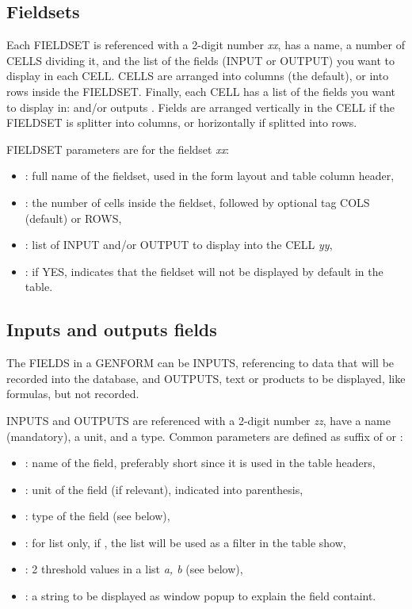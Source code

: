 \subsection{Fieldsets}

Each FIELDSET is referenced with a 2-digit number {\it xx}, has a name, a number of CELLS dividing it, and the list of the fields (INPUT or OUTPUT) you want to display in each CELL. CELLS are arranged into columns (the default), or into rows inside the FIELDSET. Finally, each CELL has a list of the fields you want to display in:  and/or outputs . Fields are arranged vertically in the CELL if the FIELDSET is splitter into columns, or horizontally if splitted into rows.

FIELDSET parameters are for the fieldset {\it xx}:
\begin{itemize}
	\item {}: full name of the fieldset, used in the form layout and table column header,
	\item {}: the number of cells inside the fieldset, followed by optional tag COLS (default) or ROWS,
	\item {}: list of INPUT and/or OUTPUT to display into the CELL {\it yy},
	\item {}: if YES, indicates that the fieldset will not be displayed by default in the table.
\end{itemize}

\subsection{Inputs and outputs fields}
The FIELDS in a GENFORM can be INPUTS, referencing to data that will be recorded into the database, and OUTPUTS, text or products to be displayed, like formulas, but not recorded.

INPUTS and OUTPUTS are referenced with a 2-digit number {\it zz}, have a name (mandatory), a unit, and a type. Common parameters are defined as suffix of  or :
\begin{itemize}
	\item {}: name of the field, preferably short since it is used in the table headers,
	\item {}: unit of the field (if relevant), indicated into parenthesis,
	\item {}: type of the field (see below),
	\item {}: for list only, if , the list will be used as a filter in the table show,
	\item {}: 2 threshold values in a list {\it a, b} (see below),
	\item {}: a string to be displayed as window popup to explain the field containt.
\end{itemize}

